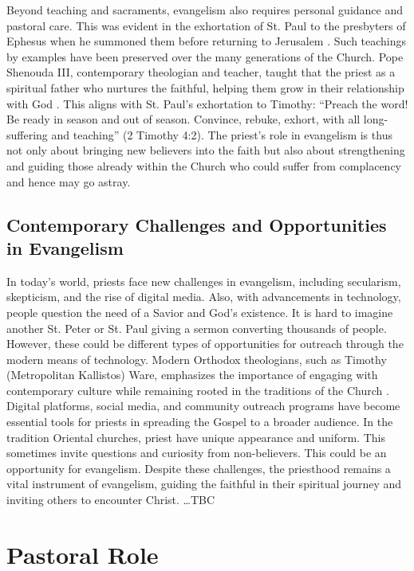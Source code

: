 \documentclass[12pt, doc]{apa7}   	%
\begin{document}
Beyond teaching and sacraments, evangelism also requires personal guidance and pastoral care.  This was evident in the exhortation of St. Paul to the presbyters of Ephesus when he summoned them before returning to Jerusalem \citep{paul_wright}.  Such teachings by examples have been preserved over the many generations of the Church. Pope Shenouda III, contemporary theologian and teacher, taught that the priest as a spiritual father who nurtures the faithful, helping them grow in their relationship with God \citep{priesthood_shenouda}. This aligns with St. Paul’s exhortation to Timothy: “Preach the word! Be ready in season and out of season. Convince, rebuke, exhort, with all long-suffering and teaching” (2 Timothy 4:2). The priest’s role in evangelism is thus not only about bringing new believers into the faith but also about strengthening and guiding those already within the Church who could suffer from complacency and hence may go astray.

\subsection{Contemporary Challenges and Opportunities in Evangelism}

In today’s world, priests face new challenges in evangelism, including secularism, skepticism, and the rise of digital media.  Also, with advancements in technology, people question the need of a Savior and God's existence.  It is hard to imagine another St. Peter or St. Paul giving a sermon converting thousands of people. However, these could be different types of opportunities for outreach through the modern means of technology. Modern Orthodox theologians, such as Timothy (Metropolitan Kallistos) Ware, emphasizes the importance of engaging with contemporary culture while remaining rooted in the traditions of the Church \citep{orthodox_church_ware}. Digital platforms, social media, and community outreach programs have become essential tools for priests in spreading the Gospel to a broader audience.  In the tradition Oriental churches, priest have unique appearance and uniform.  This sometimes invite questions and curiosity from non-believers.  This could be an opportunity for evangelism.  Despite these challenges, the priesthood remains a vital instrument of evangelism, guiding the faithful in their spiritual journey and inviting others to encounter Christ.  \dots TBC


\section{Pastoral Role}\label{pastoral}
\end{document}
